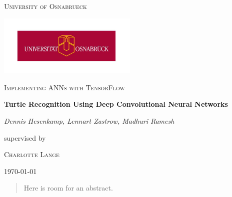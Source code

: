 \documentclass[11pt]{article}
\begin{document}
\begin{titlepage}
	\centering
	{\scshape\LARGE University of Osnabrueck \par}
	\vspace{1cm}
	\includegraphics[width=0.5\textwidth]{images/Logo-Uni-Osnabrueck.jpg}\par\vspace{2cm}
	\vspace{0.75cm}
	{\scshape\Large Implementing ANNs with TensorFlow\par}
	\vspace{1.5cm}
	{\huge\bfseries Turtle Recognition Using Deep Convolutional Neural Networks\par}
	\vspace{1.5cm}
	{\Large\itshape Dennis Hesenkamp, Lennart Zastrow,  Madhuri Ramesh\par}
	\vspace{1.5cm}
	supervised by\par
	\textsc{Charlotte Lange}
	\vfill

	{\large \today\par}
\end{titlepage}

\tableofcontents
\newpage

\begin{abstract}
    Here is room for an abstract.
\end{abstract}













\newpage

\end{document}
